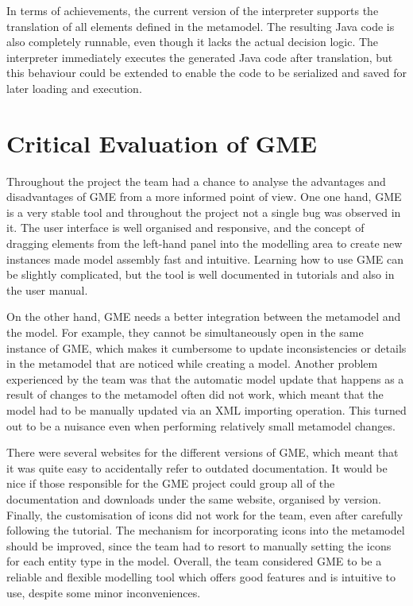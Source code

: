 \documentclass[11pt, a4paper, oneside, openright]{article}
\begin{document}
In terms of achievements, the current version of the interpreter supports the
translation of all elements defined in the metamodel. The resulting Java code is
also completely runnable, even though it lacks the actual decision logic. The
interpreter immediately executes the generated Java code after translation, but
this behaviour could be extended to enable the code to be serialized and saved
for later loading and execution.

\section{Critical Evaluation of GME}
Throughout the project the team had a chance to analyse the advantages and
disadvantages of GME from a more informed point of view. One one hand, GME is a
very stable tool and throughout the project not a single bug was observed in it. The
user interface is well organised and responsive, and the concept of dragging
elements from the left-hand panel into the modelling area to create new
instances made model assembly fast and intuitive. Learning how to use
GME can be slightly complicated, but the tool is well documented in tutorials and
also in the user manual.

On the other hand, GME needs a better integration between the metamodel and the
model. For example, they cannot be simultaneously open in the same instance of
GME, which makes it cumbersome to update inconsistencies or details in the
metamodel that are noticed while creating a model. Another problem experienced
by the team was that the automatic model update that happens as a result of
changes to the metamodel often did not work, which meant that the model had to
be manually updated via an XML importing operation. This turned out to be a
nuisance even when performing relatively small metamodel changes.

There were several websites for the different versions of GME, which meant that
it was quite easy to accidentally refer to outdated documentation. It would be
nice if those responsible for the GME project could group all of the
documentation and downloads under the same website, organised by version.
Finally, the customisation of icons did not work for the team, even after
carefully following the tutorial. The mechanism for incorporating
icons into the metamodel should be improved, since the team had to resort to
manually setting the icons for each entity type in the model. Overall, the team
considered GME to be a reliable and flexible modelling tool which offers good
features and is intuitive to use, despite some minor inconveniences.
\end{document}
